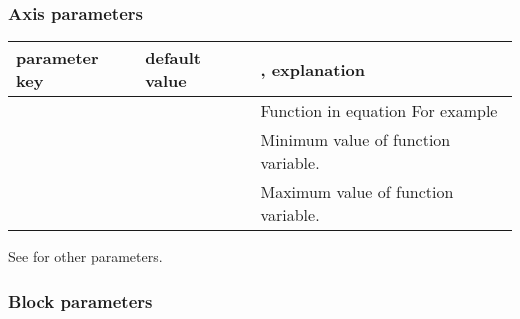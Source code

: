 \documentclass[a4paper,11pt,english]{sphinxmanual}
\begin{document}
\subsubsection{Axis parameters}
\label{\detokenize{types/types:id26}}

\begin{savenotes}\sphinxattablestart
\centering
{}
\sphinxthecaptionisattop
{}\label{\detokenize{types/types:id61}}
\sphinxaftertopcaption
\begin{tabulary}{\linewidth}[t]{|p{4cm}|p{4cm}|p{7cm}|}
\hline
\sphinxstyletheadfamily 
parameter key
&\sphinxstyletheadfamily 
default value
&\sphinxstyletheadfamily 
{}, explanation
\\
\hline
{}
&
\textendash{}
&
 Function in equation For example 
\\
\hline
{}
&
\textendash{}
&
 Minimum value of function variable.
\\
\hline
{}
&
\textendash{}
&
 Maximum value of function variable.
\\
\hline
\end{tabulary}
\par
\sphinxattableend\end{savenotes}

See {\hyperref[\detokenize{axes/axes:common-axis-params}]{}} for other parameters.


\subsubsection{Block parameters}
\label{\detokenize{types/types:id27}}
\end{document}

